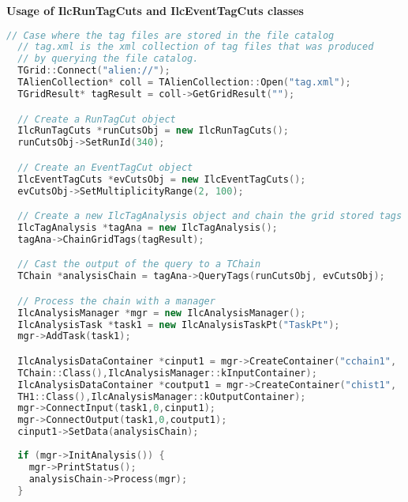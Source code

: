 \vspace{0.5 cm}
\textbf{Usage of IlcRunTagCuts and IlcEventTagCuts classes}
\begin{lstlisting}[language=C++]
  // Case where the tag files are stored in the file catalog
  // tag.xml is the xml collection of tag files that was produced 
  // by querying the file catalog.
  TGrid::Connect("alien://"); 
  TAlienCollection* coll = TAlienCollection::Open("tag.xml");
  TGridResult* tagResult = coll->GetGridResult("");

  // Create a RunTagCut object
  IlcRunTagCuts *runCutsObj = new IlcRunTagCuts();
  runCutsObj->SetRunId(340);

  // Create an EventTagCut object
  IlcEventTagCuts *evCutsObj = new IlcEventTagCuts();
  evCutsObj->SetMultiplicityRange(2, 100);

  // Create a new IlcTagAnalysis object and chain the grid stored tags
  IlcTagAnalysis *tagAna = new IlcTagAnalysis(); 
  tagAna->ChainGridTags(tagResult);

  // Cast the output of the query to a TChain
  TChain *analysisChain = tagAna->QueryTags(runCutsObj, evCutsObj);

  // Process the chain with a manager
  IlcAnalysisManager *mgr = new IlcAnalysisManager();
  IlcAnalysisTask *task1 = new IlcAnalysisTaskPt("TaskPt");
  mgr->AddTask(task1);

  IlcAnalysisDataContainer *cinput1 = mgr->CreateContainer("cchain1", 
  TChain::Class(),IlcAnalysisManager::kInputContainer);
  IlcAnalysisDataContainer *coutput1 = mgr->CreateContainer("chist1", 
  TH1::Class(),IlcAnalysisManager::kOutputContainer);
  mgr->ConnectInput(task1,0,cinput1);
  mgr->ConnectOutput(task1,0,coutput1);
  cinput1->SetData(analysisChain);
  
  if (mgr->InitAnalysis()) {
    mgr->PrintStatus();
    analysisChain->Process(mgr);
  }
\end{lstlisting}


